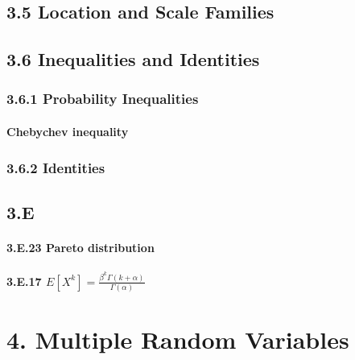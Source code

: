 \documentclass[6pt,Portrait]{article}
\let\oldparagraph\paragraph
\renewcommand{\paragraph}[1]{\oldparagraph{#1}\mbox{}}
\begin{document}
\hypertarget{location-and-scale-families}{%
\subsection{3.5 Location and Scale
Families}\label{location-and-scale-families}}

\hypertarget{inequalities-and-identities}{%
\subsection{3.6 Inequalities and
Identities}\label{inequalities-and-identities}}

\hypertarget{probability-inequalities}{%
\subsubsection{3.6.1 Probability
Inequalities}\label{probability-inequalities}}

\hypertarget{Cheb}{%
\paragraph{Chebychev inequality}\label{Cheb}}

\hypertarget{identities}{%
\subsubsection{3.6.2 Identities}\label{identities}}

\hypertarget{e}{%
\subsection{3.E}\label{e}}

\hypertarget{Pareto}{%
\paragraph{3.E.23 Pareto distribution}\label{Pareto}}

\hypertarget{GammaE}{%
\paragraph{\texorpdfstring{3.E.17
\(E[X^k]=\frac{\beta^k\Gamma(k+\alpha)}{\Gamma(\alpha)}\)}{3.E.17 E{[}X\^{}k{]}=\textbackslash{}frac\{\textbackslash{}beta\^{}k\textbackslash{}Gamma(k+\textbackslash{}alpha)\}\{\textbackslash{}Gamma(\textbackslash{}alpha)\}}}\label{GammaE}}

\hypertarget{multiple-random-variables}{%
\section{4. Multiple Random Variables}\label{multiple-random-variables}}
\end{document}
